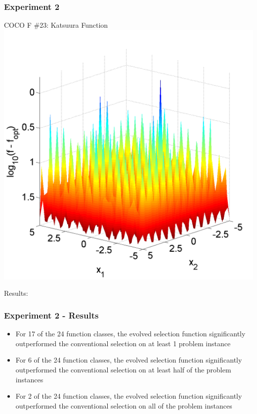 \documentclass{beamer}
\begin{document}
	\begin{frame}
		\centering	
		\frametitle{Experiment 2}
		COCO F \#23: Katsuura Function
		\includegraphics[height=0.8\textheight]{katsuura_landscape}
	\end{frame}		
	
	\begin{frame}
	Results:
		\frametitle{Experiment 2 - Results}
		\begin{itemize}
			 \item<2-|alert@2> For 17 of the 24 function classes, the evolved selection function significantly outperformed the conventional selection on at least 1 problem instance
			 \item<3-|alert@3> For 6 of the 24 function classes, the evolved selection function significantly outperformed the conventional selection on at least half of the problem instances
			 \item<4-|alert@4> For 2 of the 24 function classes, the evolved selection function significantly outperformed the conventional selection on all of the problem instances
		\end{itemize}
		
	\end{frame} 
	
\end{document}
